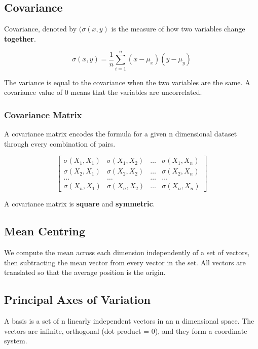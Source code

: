 \subsection{Covariance}
Covariance, denoted by $(\sigma(x,y)$ is the measure of how two variables change \textbf{together}.

\begin{equation}
    \sigma(x,y) = \frac{1}{n}\sum_{i=1}^{n}(x-\mu_{x})(y-\mu_{y})
\end{equation}

The variance is equal to the covariance when the two variables are the same. A covariance value of $0$ means that the variables are uncorrelated.

\subsubsection{Covariance Matrix}

A covariance matrix encodes the formula for a given n dimensional dataset through every combination of pairs.

\begin{equation}
    \begin{bmatrix}
    \sigma(X_{1}, X_{1}) & \sigma(X_{1}, X_{2}) & \dots & \sigma(X_{1}, X_{n}) \\ 
    \sigma(X_{2}, X_{1}) & \sigma(X_{2}, X_{2}) & \dots & \sigma(X_{2}, X_{n}) \\ 
    \dots & \dots & \dots & \dots \\
    \sigma(X_{n}, X_{1}) & \sigma(X_{n}, X_{2}) & \dots & \sigma(X_{n}, X_{n})
    \end{bmatrix}
\end{equation}

A covariance matrix is \textbf{square} and \textbf{symmetric}.

\subsection{Mean Centring}
We compute the mean across each dimension independently of a set of vectors, then subtracting the mean vector from every vector in the set. All vectors are translated so that the average position is the origin.

\subsection{Principal Axes of Variation}
A basis is a set of n linearly independent vectors in an n dimensional space. The vectors are infinite, orthogonal (dot product = 0), and they form a coordinate system.

